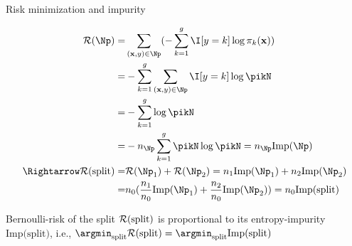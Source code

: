 \documentclass[11pt,compress,t,notes=noshow, xcolor=table]{beamer}
\begin{document}
\begin{frame2}[small]{Risk minimization and impurity}

\begin{align*}
\risk(\Np) =& \sum_{\xy \in \Np} (- \sum_{k = 1}^g \I [y=k] \log \pi_k(\xv) ) \\
=& -\sum_{k = 1}^g \sum_{\xy \in \Np} \I [y=k]\log \pikN \\
=& -\sum_{k = 1}^g \log \pikN %
\\
=& -n_{\Np} \sum_{k = 1}^g \pikN \log \pikN = n_\Np \text{Imp}(\Np)\\
\Rightarrow \risk(\text{split}) =& \risk(\Np_1) + \risk(\Np_2)  = n_1 \text{Imp}(\Np_1) + n_2 \text{Imp}(\Np_2)\\
=&n_0 (\frac{n_1}{n_0} \text{Imp}(\Np_1) + \frac{n_2}{n_0} \text{Imp}(\Np_2)) = n_0\text{Imp(split)}\\
\end{align*} 

Bernoulli-risk of the split $\mathcal{R}(\text{split})$ is proportional to its entropy-impurity $\text{Imp(split)}$, i.e., $\argmin_\text{split} \risk(\text{split}) = \argmin_\text{split} \text{Imp(split)}$ \\

\end{frame2}
\end{document}
